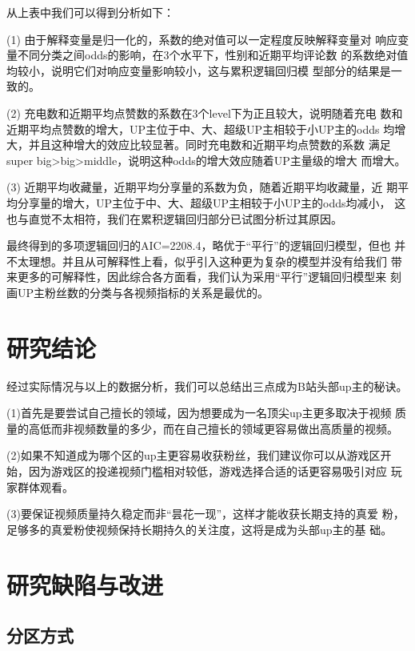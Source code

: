 \documentclass{ctexart}
\begin{document}
从上表中我们可以得到分析如下：

(1) 由于解释变量是归一化的，系数的绝对值可以一定程度反映解释变量对
响应变量不同分类之间odds的影响，在3个水平下，性别和近期平均评论数
的系数绝对值均较小，说明它们对响应变量影响较小，这与累积逻辑回归模
型部分的结果是一致的。

(2) 充电数和近期平均点赞数的系数在3个level下为正且较大，说明随着充电
数和近期平均点赞数的增大，UP主位于中、大、超级UP主相较于小UP主的odds
均增大，并且这种增大的效应比较显著。同时充电数和近期平均点赞数的系数
满足super big>big>middle，说明这种odds的增大效应随着UP主量级的增大
而增大。

(3) 近期平均收藏量，近期平均分享量的系数为负，随着近期平均收藏量，近
期平均分享量的增大，UP主位于中、大、超级UP主相较于小UP主的odds均减小，
这也与直觉不太相符，我们在累积逻辑回归部分已试图分析过其原因。

最终得到的多项逻辑回归的AIC=2208.4，略优于“平行”的逻辑回归模型，但也
并不太理想。并且从可解释性上看，似乎引入这种更为复杂的模型并没有给我们
带来更多的可解释性，因此综合各方面看，我们认为采用“平行”逻辑回归模型来
刻画UP主粉丝数的分类与各视频指标的关系是最优的。

\section{研究结论}

经过实际情况与以上的数据分析，我们可以总结出三点成为B站头部up主的秘诀。

(1)首先是要尝试自己擅长的领域，因为想要成为一名顶尖up主更多取决于视频
质量的高低而非视频数量的多少，而在自己擅长的领域更容易做出高质量的视频。

(2)如果不知道成为哪个区的up主更容易收获粉丝，我们建议你可以从游戏区开
始，因为游戏区的投递视频门槛相对较低，游戏选择合适的话更容易吸引对应
玩家群体观看。

(3)要保证视频质量持久稳定而非“昙花一现”，这样才能收获长期支持的真爱
粉，足够多的真爱粉使视频保持长期持久的关注度，这将是成为头部up主的基
础。

\section{研究缺陷与改进}

\subsection{分区方式}
\end{document}
